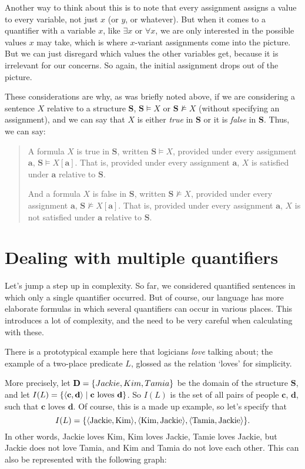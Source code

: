 Another way to think about this is to note that every assignment assigns a value to every variable, not just $x$ (or $y$, or whatever). But when it comes to a quantifier with a variable $x$, like $\exists x$ or $\forall x$, we are only interested in the possible values $x$ may take, which is where $x$-variant assignments come into the picture. But we can just disregard which values the other variables get, because it is irrelevant for our concerns. So again, the initial assignment drops out of the picture.  

These considerations are why, as was briefly noted above, if we are considering a sentence $X$ relative to a structure $\mathbf{S}$, $\mathbf{S} \models X$ or $\mathbf{S} \not\models X$ (without specifying an assignment), and we can say that $X$ is either \textit{true} in $\mathbf{S}$ or it is \textit{false} in $\mathbf{S}$. Thus, we can say:

\begin{quote}
A formula $X$ is true in $\mathbf{S}$, written $\mathbf{S} \models X$, provided under every assignment $\mathbf{a}$, $\mathbf{S} \models X[\mathbf{a}]$. That is, provided under every assignment $\mathbf{a}$, $X$ is satisfied under $\mathbf{a}$ relative to $\mathbf{S}$. 

And a formula $X$ is false in $\mathbf{S}$, written $\mathbf{S} \not \models X$, provided under every assignment $\mathbf{a}$, $\mathbf{S} \not\models X[\mathbf{a}]$. That is, provided under every assignment $\mathbf{a}$, $X$ is not satisfied under $\mathbf{a}$ relative to $\mathbf{S}$. 
\end{quote}

\section{Dealing with multiple quantifiers}

Let's jump a step up in complexity. So far, we considered quantified sentences in which only a single quantifier occurred. But of course, our language has more elaborate formulas in which several quantifiers can occur in various places. This introduces a lot of complexity, and the need to be very careful when calculating with these. 

There is a prototypical example here that logicians \textit{love} talking about; the example of a two-place predicate $L$, glossed as the relation `loves' for simplicity.

More precisely, let $\mathbf{D}=\{Jackie, Kim, Tamia\}$ be the domain of the structure $\mathbf{S}$, and let $I(L)=\{\langle\mathbf{c}, \mathbf{d}\rangle \mid \mathbf{c}\text{ loves }\mathbf{d}\}$. So $I(L)$ is the set of all pairs of people $\mathbf{c}$, $\mathbf{d}$, such that $\mathbf{c}$ loves $\mathbf{d}$. Of course, this is a made up example, so let's specify that 
\[
I(L)=\{\langle\text{Jackie}, \text{Kim}\rangle, \langle\text{Kim}, \text{Jackie}\rangle, \langle\text{Tamia}, \text{Jackie}\rangle\}.
\]
%
In other words, Jackie loves Kim, Kim loves Jackie, Tamie loves Jackie, but Jackie does not love Tamia, and Kim and Tamia do not love each other. This can also be represented with the following graph:

